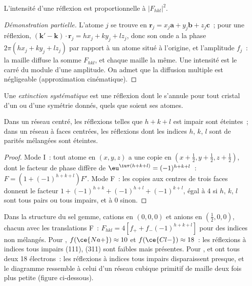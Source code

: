 \begin{proposition}[Intensité]\label{prop:b3:x-ray-diffraction:intensity}
L'intensité d'une réflexion est proportionnelle à $|F_{hkl}|^2$.
\end{proposition}

\begin{proof}[Démonstration partielle]
L'atome $j$ se trouve en $\mathbf r_j = x_j\mathbf a + y_j\mathbf b + z_j\mathbf c$~;
pour une réflexion,
$(\mathbf k' - \mathbf k)\cdot\mathbf r_j = hx_j + ky_j + lz_j$, donc son
onde a la phase
$2\pi(hx_j + ky_j + lz_j)$ par rapport à un atome situé à l'origine, et
l'amplitude $f_j$~:
la maille diffuse la somme $F_{hkl}$, et chaque maille la même. Une
intensité est le carré du module d'une amplitude. On admet que la
diffusion multiple est négligeable (approximation cinématique).
\end{proof}

\begin{definition}\label{def:b3:x-ray-diffraction:absence}
Une \emph{extinction systématique} est une réflexion
dont le  s'annule pour tout cristal d'un  ou d'une symétrie donnés, quels que soient ses atomes.
\end{definition}

\begin{proposition}\label{prop:b3:x-ray-diffraction:absences}
Dans un réseau centré, les réflexions telles que $h + k + l$ est impair
sont éteintes~; dans un réseau à faces centrées, les réflexions dont les
indices $h$, $k$, $l$ sont de parités mélangées sont éteintes.
\end{proposition}

\begin{proof}
Mode I~: tout atome en $(x,y,z)$ a une copie en $(x + \frac12, y + \frac12, z + \frac12)$,
dont le facteur de phase diffère de $\eu^{\iu\pi(h+k+l)} = (-1)^{h+k+l}$~: $F = (1 +
(-1)^{h+k+l})F'$. Mode F~: les copies aux centres de trois faces donnent
le facteur $1 +
(-1)^{h+k} + (-1)^{h+l} + (-1)^{k+l}$, égal à 4 si $h$, $k$, $l$ sont
tous pairs ou tous impairs, et à 0 sinon.
\end{proof}

\begin{example}\label{ex:b3:x-ray-diffraction:nacl-kcl}
Dans la structure du sel gemme, cations en $(0,0,0)$ et anions en
$(\frac12,0,0)$, chacun avec les translations F~: $F_{hkl} = 4[f_+ + f_-(-1)^{h+k+l}]$
pour des indices non mélangés.
Pour , $f(\ce{Na+}) \approx 10$ et $f(\ce{Cl-}) \approx 18$~:
les réflexions à indices tous impairs
(111), (311) sont faibles mais présentes. Pour ,  et
 ont tous deux 18
électrons~: les réflexions à indices tous impairs disparaissent presque,
et le diagramme ressemble à celui d'un réseau cubique primitif de maille
deux fois plus petite (figure ci-dessous).
\end{example}

